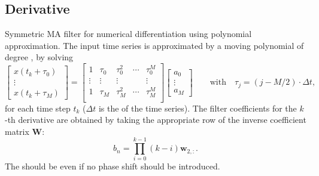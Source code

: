 \subsection{Derivative}
Symmetric MA filter for numerical differentiation using polynomial approximation. The input time series is approximated by a moving polynomial of degree , by solving
\begin{equation}
  \begin{bmatrix} x(t_k+\tau_0) \\ \vdots \\ x(t_k+\tau_M) \end{bmatrix}
  =
  \begin{bmatrix}
  1      & \tau_0 & \tau_0^2 & \cdots & \tau_0^M \\
  \vdots & \vdots & \vdots   &        & \vdots   \\
  1      & \tau_M & \tau_M^2 & \cdots & \tau_M^M \\
  \end{bmatrix}%
  \begin{bmatrix}
  a_0 \\ \vdots \\ a_M
  \end{bmatrix}
  \qquad\text{with}\quad
  \tau_j =  (j-M/2)\cdot \Delta t,
\end{equation}
for each time step $t_k$ ($\Delta t$ is the  of the time series).
The filter coefficients for the $k$-th derivative are obtained by taking the appropriate row of the inverse coefficient matrix $\mathbf{W}$:
\begin{equation}
  b_n = \prod_{i=0}^{k-1} (k-i) \mathbf{w}_{2,:}.
\end{equation}
The  should be even if no phase shift should be introduced.


